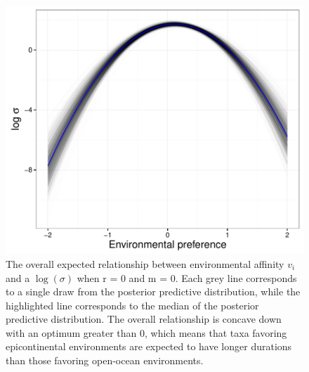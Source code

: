 \documentclass{article}
\begin{document}
\begin{figure}[ht]
  \centering
  \includegraphics[height = 0.5\textheight,width=\textwidth,keepaspectratio=true]{figure/env_effect}
  \caption{The overall expected relationship between environmental affinity \(v_{i}\) and a \(\log(\sigma)\) when r = 0 and m = 0. Each grey line corresponds to a single draw from the posterior predictive distribution, while the highlighted line corresponds to the median of the posterior predictive distribution. The overall relationship is concave down with an optimum greater than 0, which means that taxa favoring epicontinental environments are expected to have longer durations than those favoring open-ocean environments.}
  \label{fig:env_mean}
\end{figure}


\end{document}

